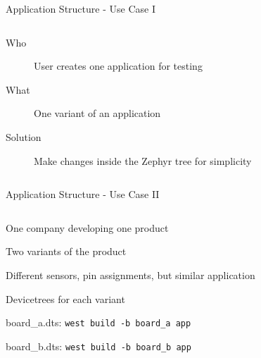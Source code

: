 \documentclass[10pt, aspectratio=169]{beamer}
\begin{document}
\begin{frame}[fragile]{Application Structure - Use Case I}
  \begin{columns}
    \begin{column}{0.6\textwidth}
      \begin{description}
         \item[Who] User creates one application for testing
         \item[What] One variant of an application
         \item[Solution] Make changes inside the Zephyr tree for simplicity \footnotemark
      \end{description}
    \end{column}
    \begin{column}{0.4\textwidth}
      \begin{figure}
        \hspace*{1.5cm}
        
      \end{figure}
    \end{column}
  \end{columns}
\end{frame}
\begin{frame}[fragile]{Application Structure - Use Case II}
  \begin{columns}
    \begin{column}{0.6\textwidth}
      \begin{description}
         \item[Who] One company developing one product
         \item [What] Two variants of the product
         \item Different sensors, pin assignments, but similar application
         \item[Solution] Devicetrees for each variant
         \item board\_a.dts: {\scriptsize\texttt{west build -b board\_a app}}
         \item board\_b.dts: {\scriptsize\texttt{west build -b board\_b app}}
      \end{description}
    \end{column}
    \begin{column}{0.4\textwidth}
      \begin{figure}
        \hspace*{0.4cm}
        
      \end{figure}
    \end{column}
  \end{columns}
\end{frame}
\end{document}
